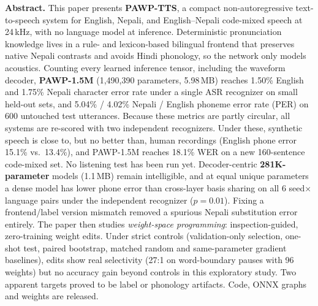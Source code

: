\small
\noindent\textbf{Abstract.}\;
This paper presents \textbf{PAWP-TTS}, a compact non-autoregressive text-to-speech system for English, Nepali, and English--Nepali code-mixed speech at 24\,kHz, with no language model at inference. Deterministic pronunciation knowledge lives in a rule- and lexicon-based bilingual frontend that preserves native Nepali contrasts and avoids Hindi phonology, so the network only models acoustics. Counting every learned inference tensor, including the waveform decoder, \textbf{PAWP-1.5M} (1,490,390 parameters, 5.98\,MB) reaches 1.50\% English and 1.75\% Nepali character error rate under a single ASR recognizer on small held-out sets, and 5.04\% / 4.02\% Nepali / English phoneme error rate (PER) on 600 untouched test utterances. Because these metrics are partly circular, all systems are re-scored with two independent recognizers. Under these, synthetic speech is close to, but no better than, human recordings (English phone error 15.1\% vs.\ 13.4\%), and PAWP-1.5M reaches 18.1\% WER on a new 160-sentence code-mixed set. No listening test has been run yet. Decoder-centric \textbf{281K-parameter} models (1.1\,MB) remain intelligible, and at equal unique parameters a dense model has lower phone error than cross-layer basis sharing on all 6 seed$\times$language pairs under the independent recognizer ($p=0.01$). Fixing a frontend/label version mismatch removed a spurious Nepali substitution error entirely. The paper then studies \emph{weight-space programming}: inspection-guided, zero-training weight edits. Under strict controls (validation-only selection, one-shot test, paired bootstrap, matched random and same-parameter gradient baselines), edits show real selectivity (27:1 on word-boundary pauses with 96 weights) but no accuracy gain beyond controls in this exploratory study. Two apparent targets proved to be label or phonology artifacts. Code, ONNX graphs and weights are released.
\normalsize
